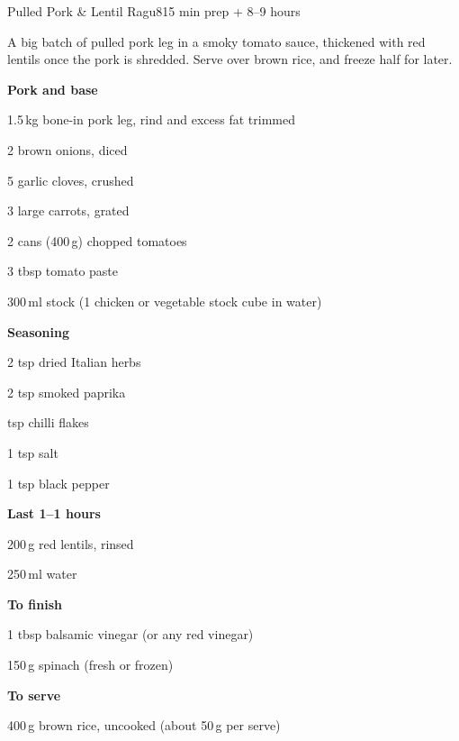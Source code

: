 
\begin{recipebox}{Pulled Pork \& Lentil Ragu}{8}{15 min prep + 8--9 hours}

A big batch of pulled pork leg in a smoky tomato sauce, thickened with red
lentils once the pork is shredded. Serve over brown rice, and freeze half for
later.

\begin{ingredients}
  \item[] \textbf{Pork and base}
  \item 1.5\,kg bone-in pork leg, rind and excess fat trimmed
  \item 2 brown onions, diced
  \item 5 garlic cloves, crushed
  \item 3 large carrots, grated
  \item 2 cans (400\,g) chopped tomatoes
  \item 3 tbsp tomato paste
  \item 300\,ml stock (1 chicken or vegetable stock cube in water)
  \item[] \textbf{Seasoning}
  \item 2 tsp dried Italian herbs
  \item 2 tsp smoked paprika
  \item {} tsp chilli flakes
  \item 1 tsp salt
  \item 1 tsp black pepper
  \item[] \textbf{Last 1--1 hours}
  \item 200\,g red lentils, rinsed
  \item 250\,ml water
  \item[] \textbf{To finish}
  \item 1 tbsp balsamic vinegar (or any red vinegar)
  \item 150\,g spinach (fresh or frozen)
  \item[] \textbf{To serve}
  \item 400\,g brown rice, uncooked (about 50\,g per serve)
\end{ingredients}


\end{recipebox}
